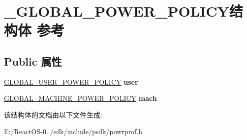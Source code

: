 \hypertarget{struct___g_l_o_b_a_l___p_o_w_e_r___p_o_l_i_c_y}{}\section{\+\_\+\+G\+L\+O\+B\+A\+L\+\_\+\+P\+O\+W\+E\+R\+\_\+\+P\+O\+L\+I\+C\+Y结构体 参考}
\label{struct___g_l_o_b_a_l___p_o_w_e_r___p_o_l_i_c_y}
\subsection*{Public 属性}
\begin{DoxyCompactItemize}
\item 
\mbox{\label{struct___g_l_o_b_a_l___p_o_w_e_r___p_o_l_i_c_y_a6c5840601e5895af336ad5fec13c7ee1}} 
\hyperlink{struct___g_l_o_b_a_l___u_s_e_r___p_o_w_e_r___p_o_l_i_c_y}{G\+L\+O\+B\+A\+L\+\_\+\+U\+S\+E\+R\+\_\+\+P\+O\+W\+E\+R\+\_\+\+P\+O\+L\+I\+CY} {\bfseries user}
\item 
\mbox{\label{struct___g_l_o_b_a_l___p_o_w_e_r___p_o_l_i_c_y_a8ea923efc5177a7984cfcf93fcc29d44}} 
\hyperlink{struct___g_l_o_b_a_l___m_a_c_h_i_n_e___p_o_w_e_r___p_o_l_i_c_y}{G\+L\+O\+B\+A\+L\+\_\+\+M\+A\+C\+H\+I\+N\+E\+\_\+\+P\+O\+W\+E\+R\+\_\+\+P\+O\+L\+I\+CY} {\bfseries mach}
\end{DoxyCompactItemize}


该结构体的文档由以下文件生成\+:\begin{DoxyCompactItemize}
\item 
E\+:/\+React\+O\+S-\/0../sdk/include/psdk/powrprof.\+h\end{DoxyCompactItemize}
